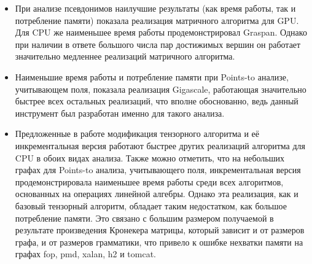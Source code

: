 \begin{itemize}
    \item При анализе псевдонимов наилучшие результаты (как время работы, так и потребление памяти) показала реализация матричного алгоритма для GPU. Для CPU же наименьшее время работы продемонстрировал Graspan. Однако при наличии в ответе большого числа пар достижимых вершин он работает значительно медленнее реализаций матричного алгоритма.
    \item Наименьшие время работы и потребление памяти при Points-to анализе, учитывающем поля, показала реализация Gigascale, работающая значительно быстрее всех остальных реализаций, что вполне обоснованно, ведь данный инструмент был разработан именно для такого анализа.
    \item Предложенные в работе модификация тензорного алгоритма и её инкрементальная версия работают быстрее других реализаций алгоритма для CPU в обоих видах анализа. Также можно отметить, что на небольших графах для Points-to анализа, учитывающего поля, инкрементальная версия продемонстрировала наименьшее время работы среди всех алгоритмов, основанных на операциях линейной алгебры. Однако эта реализация, как и базовый тензорный алгоритм, обладает таким недостатком, как большое потребление памяти. Это связано с большим размером получаемой в результате произведения Кронекера матрицы, который зависит и от размеров графа, и от размеров грамматики, что привело к ошибке нехватки памяти на графах fop, pmd, xalan, h2 и tomcat.
\end{itemize}

